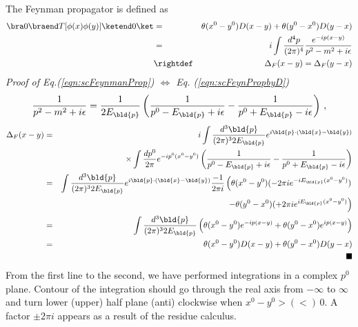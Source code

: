 The Feynman propagator is defined as
\begin{eqnarray}
\bra 0 \braend T[\phi(x) \phi(y)] \ketend 0 \ket
&=&
\theta(x^0 - y^0) D(x-y)
+
\theta(y^0 - x^0) D(y-x)
\label{eqn:scFeynPropbyD}
\\
&=&
i \int \frac{d^4 p}{(2\pi)^4}
\frac{e^{-ip (x-y)}}{p^2 - m^2 + i\epsilon}
\label{eqn:scFeynmanProp}
\label{eqn:FeynmanPropDefSc}
\\
&\rightdef&
\Delta_F(x-y)
=
\Delta_F(y-x)
\nonumber
\end{eqnarray}
{\it Proof of Eq.(\ref{eqn:scFeynmanProp}) $\Leftrightarrow$ Eq. (\ref{eqn:scFeynPropbyD})}\\
\begin{eqnarray}
\frac{1}{p^2 - m^2 + i\epsilon}
=
\frac{1}{2 E_{\bld{p}}} \left(
\frac{1}{p^0 - E_{\bld{p}} + i\epsilon}
-
\frac{1}{p^0 + E_{\bld{p}} - i\epsilon}
\right)
\,,
\end{eqnarray}
\begin{eqnarray}
\Delta_F(x-y)
&=&
i \int \frac{d^3 \bld{p}}{(2\pi)^3 2 E_{\bld{p}}} e^{i\bld{p}\cdot (\bld{x} - \bld{y})}
\nonumber\\
&&
\times \int \frac{d p^0}{2\pi} e^{- ip^0 (x^0 - y^0)}
\left(
\frac{1}{p^0 - E_{\bld{p}} + i\epsilon}
-
\frac{1}{p^0 + E_{\bld{p}} - i\epsilon}
\right)
\nonumber\\
&=&
\int \frac{d^3 \bld{p}}{(2\pi)^3 2 E_{\bld{p}}} e^{i\bld{p}\cdot (\bld{x} - \bld{y})}
\frac{-1}{2\pi i} \left(
\theta(x^0 - y^0) (-2\pi i e^{-i E_{\bld{p}}(x^0 - y^0)})
\right.
\nonumber\\
&&
\left.
-
\theta(y^0 - x^0) (+2\pi i e^{i E_{\bld{p}}(x^0 - y^0)}
\right)
\nonumber\\
&=&
\int \frac{d^3 \bld{p}}{(2\pi)^3 2 E_{\bld{p}}} 
\left(
\theta(x^0 - y^0) e^{-ip(x-y)}
+
\theta(y^0 - x^0) e^{i p(x-y)}
\right)
\nonumber\\
&=&
\theta(x^0 - y^0) D(x-y)
+
\theta(y^0 - x^0) D(y-x)
\nonumber\\
&& 
\hspace{65mm}
\blacksquare
\end{eqnarray}
From the first line to the second, we have performed integrations in a complex $p^0$ plane.
Contour of the integration should go through the real axis from $- \infty$ to $\infty$ and
turn lower (upper) half plane (anti) clockwise when $x^0 - y^0 > (<)\, 0$. A factor
$\pm 2\pi i$ appears as a result of the residue calculus.

